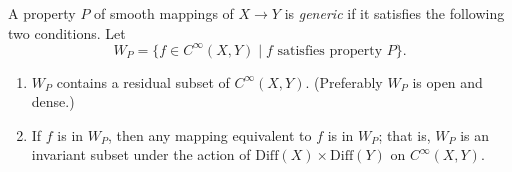 A property $P$ of smooth mappings of $X \rightarrow Y$ is \emph{generic} if it satisfies the following two conditions. Let
$$
W_P = \{f \in C^\infty(X, Y) \mid f \text{ satisfies property } P\}.
$$

\begin{enumerate}
\item[(1)] $W_P$ contains a residual subset of $C^\infty(X, Y)$. (Preferably $W_P$ is open and dense.)

\item[(2)] If $f$ is in $W_P$, then any mapping equivalent to $f$ is in $W_P$; that is, $W_P$ is an invariant subset under the action of $\text{Diff}(X) \times \text{Diff}(Y)$ on $C^\infty(X, Y)$.
\end{enumerate}
